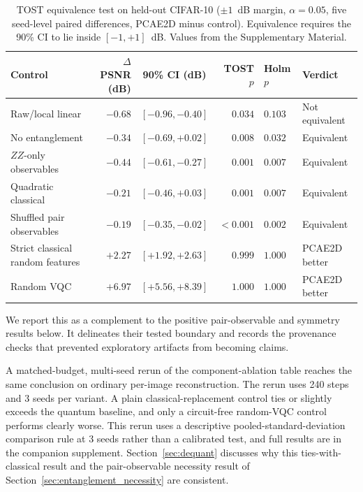 \documentclass[pdflatex,sn-basic]{sn-jnl}
\begin{document}
\begin{table}[t]
  \centering
  \caption[TOST equivalence test on held-out CIFAR-10]{TOST equivalence
           test on held-out CIFAR-10 ($\pm1$~dB margin, $\alpha=0.05$, five
           seed-level paired differences, PCAE2D minus control). Equivalence
           requires the 90\% CI to lie inside $[-1,+1]$~dB. Values from the
           Supplementary Material.}
  \label{tab:tost_main}
  \footnotesize\bfseries
  \setlength{\tabcolsep}{2.5pt}
  \begin{tabular}{@{}l r c r l l@{}}
    \toprule
    Control                          & $\Delta$PSNR (dB) & 90\% CI (dB)       & TOST $p$  & Holm $p$ & Verdict \\
    \midrule
    Raw/local linear                 & $-0.68$ & $[-0.96,-0.40]$ & $0.034$   & $0.103$ & Not equivalent \\
    No entanglement                  & $-0.34$ & $[-0.69,+0.02]$ & $0.008$   & $0.032$ & Equivalent \\
    $ZZ$-only observables            & $-0.44$ & $[-0.61,-0.27]$ & $0.001$   & $0.007$ & Equivalent \\
    Quadratic classical              & $-0.21$ & $[-0.46,+0.03]$ & $0.001$   & $0.007$ & Equivalent \\
    Shuffled pair observables        & $-0.19$ & $[-0.35,-0.02]$ & $<0.001$  & $0.002$ & Equivalent \\
    Strict classical random features & $+2.27$ & $[+1.92,+2.63]$ & $0.999$   & $1.000$ & PCAE2D better \\
    Random VQC                       & $+6.97$ & $[+5.56,+8.39]$ & $1.000$   & $1.000$ & PCAE2D better \\
    \bottomrule
  \end{tabular}
\end{table} We report this as a complement to the positive pair-observable
and symmetry results below. It delineates their tested boundary and records the
provenance checks that prevented exploratory artifacts from becoming claims.

A matched-budget, multi-seed rerun of the component-ablation table reaches the
same conclusion on ordinary per-image reconstruction. The rerun uses 240 steps
and 3 seeds per variant. A plain classical-replacement control ties or slightly
exceeds the quantum baseline, and only a circuit-free random-VQC control
performs clearly worse. This rerun uses a descriptive pooled-standard-deviation
comparison rule at 3 seeds rather than a calibrated test, and full results are in
the companion supplement. Section~\ref{sec:dequant} discusses why this
ties-with-classical result and the
pair-observable necessity result of
Section~\ref{sec:entanglement_necessity} are consistent.
\end{document}
